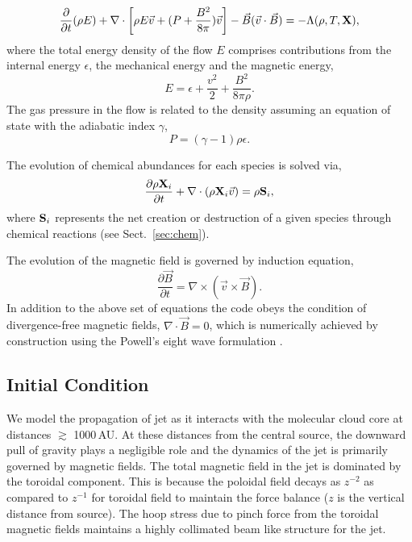 \documentclass[useAMS,usenatbib]{mn2e}
\begin{document}
\begin{equation}\label{encons1}
\frac{\partial}{\partial t}(\rho E)
+ \nabla \cdot\left[ \rho E \vec{v} + (P + \frac{B^2}{8\pi})\vec{v}\right]  
- \vec{B}(\vec{v}\cdot\vec{B}) = -\Lambda(\rho,T,{\bf{X}}),
\end{equation}
%
%
where the total energy density of the flow $E$ comprises contributions from 
the internal energy $\epsilon$, the mechanical energy and the magnetic energy,
%
\begin{equation}\label{encons2}
 E = \epsilon + \frac{v^2}{2} + \frac{B^2}{8 \pi \rho}.
\end{equation}
The gas pressure in the flow is related to the density assuming an equation 
of state with the adiabatic index $\gamma$,
%
\begin{equation}\label{EOS}
P = (\gamma - 1) \rho \epsilon.
\end{equation}

The evolution of chemical abundances for each species is solved via,
%
\begin{equation}\label{chemevol}
\frac{\partial \rho{\bf{X}}_{i}}{\partial t} + \nabla \cdot (\rho
{\bf{X}}_{i} \vec{v})  = \rho {\bf{S}}_{i},
\end{equation}
where ${\bf{S}}_{i}$ represents the net creation or destruction of a
given species through chemical reactions (see Sect.~\ref{sec:chem}).

The evolution of the magnetic field is governed by induction equation,
%
\begin{equation}\label{induction}
\frac{\partial \vec{B}}{\partial t} = \nabla \times \left(\vec{v}\times \vec{B}\right).
\end{equation}
%
In addition to the above set of equations the code obeys the condition of divergence-free 
magnetic fields, $\nabla \cdot \vec{B} = 0$, which is numerically achieved by construction 
using the Powell's eight wave formulation \citep{Powell:1999p14822}.

\subsection{Initial Condition}
We model the propagation of jet as it interacts with the molecular
cloud core at distances $\gtrsim$ 1000\,AU. 
At these distances from the central source, the downward pull of gravity plays a
negligible role and the dynamics of the jet is primarily governed by magnetic fields.
The total magnetic field in the jet is dominated by the toroidal
component. This is because the poloidal field decays as $z^{-2}$ as
compared to $z^{-1}$ for toroidal field to maintain the force balance ($z$ is the vertical distance from source). 
The hoop stress due to pinch force from the toroidal magnetic fields maintains
a highly collimated beam like structure for the jet.
%
\end{document}
